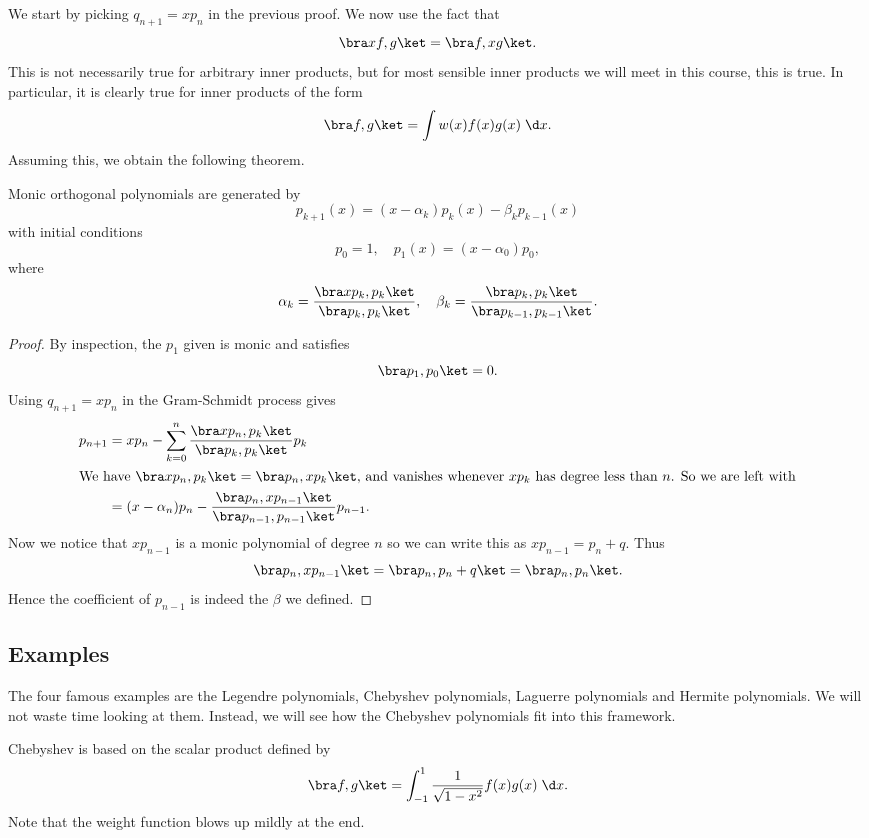 \documentclass[a4paper]{article}
\begin{document}
We start by picking $q_{n + 1} = xp_n$ in the previous proof. We now use the fact that
\[
  \bra xf, g\ket = \bra f, xg\ket.
\]
This is not necessarily true for arbitrary inner products, but for most sensible inner products we will meet in this course, this is true. In particular, it is clearly true for inner products of the form
\[
  \bra f, g\ket = \int w(x) f(x) g(x)\;\d x.
\]
Assuming this, we obtain the following theorem.
\begin{thm}
  Monic orthogonal polynomials are generated by
  \[
    p_{k + 1}(x) = (x - \alpha_k)p_k(x) - \beta_k p_{k - 1}(x)
  \]
  with initial conditions
  \[
    p_0 = 1,\quad p_1(x) = (x - \alpha_0) p_0,
  \]
  where
  \[
    \alpha_k = \frac{\bra x p_k, p_k\ket}{\bra p_k, p_k\ket},\quad \beta_k = \frac{\bra p_k, p_k\ket}{\bra p_{k - 1}, p_{k - 1}\ket}.
  \]
\end{thm}

\begin{proof}
  By inspection, the $p_1$ given is monic and satisfies
  \[
    \bra p_1, p_0\ket = 0.
  \]
  Using $q_{n + 1} = x p_n$ in the Gram-Schmidt process gives
  \begin{align*}
    p_{n + 1} &= xp_n - \sum_{k = 0}^n \frac{\bra x p_n, p_k\ket}{\bra p_k, p_k\ket} p_k\\
    \intertext{We have $\bra xp_n, p_k\ket = \bra p_n, xp_k\ket$, and vanishes whenever $x p_k$ has degree less than $n$. So we are left with}
    &= (x - \alpha_n) p_n - \frac{\bra p_n, xp_{n - 1}\ket}{\bra p_{n - 1}, p_{n - 1}\ket} p_{n - 1}.
  \end{align*}
  Now we notice that $xp_{n - 1}$ is a monic polynomial of degree $n$ so we can write this as $x p_{n - 1} = p_n + q$. Thus
  \[
    \bra p_n, xp_{n - 1}\ket = \bra p_n, p_n + q\ket = \bra p_n, p_n\ket.
  \]
  Hence the coefficient of $p_{n - 1}$ is indeed the $\beta$ we defined.
\end{proof}

\subsection{Examples}
The four famous examples are the Legendre polynomials, Chebyshev polynomials, Laguerre polynomials and Hermite polynomials. We will not waste time looking at them. Instead, we will see how the Chebyshev polynomials fit into this framework.

Chebyshev is based on the scalar product defined by
\[
  \bra f, g\ket = \int_{-1}^1 \frac{1}{\sqrt{1 - x^2}} f(x) g(x)\;\d x.
\]
Note that the weight function blows up mildly at the end.
\end{document}
